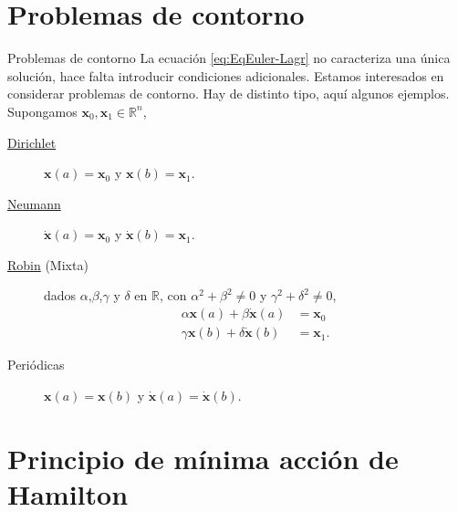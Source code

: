 \documentclass[handout,hyperref={colorlinks=true}]{beamer}
\newcommand{\rr}{\mathbb{R}}
\renewcommand{\b}[1]{\boldsymbol{#1}}
\begin{document}
\section{Problemas de contorno}
\begin{frame}{Problemas de contorno}
La ecuación \eqref{eq:EqEuler-Lagr} no caracteriza una única solución, hace falta introducir condiciones adicionales. Estamos interesados en considerar  problemas de contorno. Hay de distinto tipo, aquí algunos ejemplos. Supongamos $\b{x}_0,\b{x}_1\in\rr^n$,

\begin{description}
\item[\href{https://es.wikipedia.org/wiki/Condici\%C3\%B3n_de_frontera_de_Dirichlet}{Dirichlet}] $\b{x}(a)=\b{x}_0$ y $\b{x}(b)=\b{x}_1$. 
\item[\href{https://es.wikipedia.org/wiki/Condici\%C3\%B3n_de_frontera_de_Neumann}{Neumann}] $\b{\dot{x}}(a)=\b{x}_0$ y $\b{\dot{x}}(b)=\b{x}_1$. 
\item[\href{https://es.wikipedia.org/wiki/Condici\%C3\%B3n_de_frontera_de_Robin}{Robin} (Mixta)] dados $\alpha$,$\beta$,$\gamma$ y $\delta$ en $\rr$, con $\alpha^2+\beta^2\neq 0$ y $\gamma^2+\delta^2\neq 0$,
\[\begin{array}{cc}
\alpha\b{x}(a)+\beta\b{\dot{x}}(a)&=\b{x}_0\\
\gamma\b{x}(b)+\delta\b{\dot{x}}(b)&=\b{x}_1.
  \end{array}
\]
\item[Periódicas] $\b{x}(a)=\b{x}(b)$ y $\b{\dot{x}}(a)=\b{\dot{x}}(b)$.
\end{description}

\end{frame}

\section{Principio de mínima acción de Hamilton}
\end{document}
